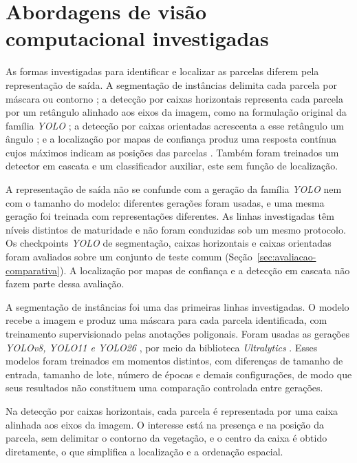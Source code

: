 \section{Abordagens de vis\~ao computacional investigadas}
\label{sec:abordagens-investigadas}

As formas investigadas para identificar e localizar as parcelas diferem pela representa\c{c}\~ao de sa\'ida. A segmenta\c{c}\~ao de inst\^ancias delimita cada parcela por m\'ascara ou contorno \citep{he2017}; a detec\c{c}\~ao por caixas horizontais representa cada parcela por um ret\^angulo alinhado aos eixos da imagem, como na formula\c{c}\~ao original da fam\'ilia \textit{YOLO} \citep{redmon2016}; a detec\c{c}\~ao por caixas orientadas acrescenta a esse ret\^angulo um \^angulo \citep{ding2019}; e a localiza\c{c}\~ao por mapas de confian\c{c}a produz uma resposta cont\'inua cujos m\'aximos indicam as posi\c{c}\~oes das parcelas \citep{arruda2022}. Tamb\'em foram treinados um detector em cascata e um classificador auxiliar, este sem fun\c{c}\~ao de localiza\c{c}\~ao.

A representa\c{c}\~ao de sa\'ida n\~ao se confunde com a gera\c{c}\~ao da fam\'ilia \textit{YOLO} nem com o tamanho do modelo: diferentes gera\c{c}\~oes foram usadas, e uma mesma gera\c{c}\~ao foi treinada com representa\c{c}\~oes diferentes. As linhas investigadas t\^em n\'iveis distintos de maturidade e n\~ao foram conduzidas sob um mesmo protocolo. Os checkpoints \textit{YOLO} de segmenta\c{c}\~ao, caixas horizontais e caixas orientadas foram avaliados sobre um conjunto de teste comum (Se\c{c}\~ao~\ref{sec:avaliacao-comparativa}). A localiza\c{c}\~ao por mapas de confian\c{c}a e a detec\c{c}\~ao em cascata n\~ao fazem parte dessa avalia\c{c}\~ao.

A segmenta\c{c}\~ao de inst\^ancias foi uma das primeiras linhas investigadas. O modelo recebe a imagem e produz uma m\'ascara para cada parcela identificada, com treinamento supervisionado pelas anota\c{c}\~oes poligonais. Foram usadas as gera\c{c}\~oes \textit{YOLOv8, YOLO11 e YOLO26} \citep{jocher2026}, por meio da biblioteca \textit{Ultralytics} \citep{jocher2023}. Esses modelos foram treinados em momentos distintos, com diferen\c{c}as de tamanho de entrada, tamanho de lote, n\'umero de \'epocas e demais configura\c{c}\~oes, de modo que seus resultados n\~ao constituem uma compara\c{c}\~ao controlada entre gera\c{c}\~oes.

Na detec\c{c}\~ao por caixas horizontais, cada parcela \'e representada por uma caixa alinhada aos eixos da imagem. O interesse est\'a na presen\c{c}a e na posi\c{c}\~ao da parcela, sem delimitar o contorno da vegeta\c{c}\~ao, e o centro da caixa \'e obtido diretamente, o que simplifica a localiza\c{c}\~ao e a ordena\c{c}\~ao espacial.

